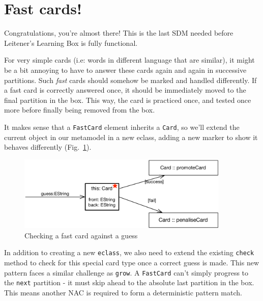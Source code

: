 \newpage
\section{Fast cards!}
\genHeader
\hypertarget{sec:fastCard}{}

Congratulations, you're almost there! This is the last SDM needed before Leitener's Learning Box is fully functional.

For very simple cards (i.e: words in different language that are similar), it might be a bit annoying to have to answer these cards again and again in
successive partitions. Such \emph{fast} cards should somehow be marked and handled differently. If a fast card is correctly answered once, it should be
immediately moved to the final partition in the box. This way, the card is practiced once, and tested once more before finally being removed from the
box.

It makes sense that a \texttt{FastCard} element inherits a \texttt{Card}, so we'll extend the current object in our metamodel in a new eclass, adding a
new marker to show it behaves differently (Fig.~\ref{fig:goal_fastCard}).

\begin{figure}[htbp]
	\centering
    \includegraphics[width=0.9\textwidth]{goal_fastCard}
	\caption{Checking a fast card against a guess}
	\label{fig:goal_fastCard}
\end{figure}
\FloatBarrier

In addition to creating a new \texttt{eclass}, we also need to extend the existing \texttt{check} method to check for this special card type once a correct
guess is made. This new pattern faces a similar challenge as \texttt{grow}. A \texttt{FastCard} can't simply progress to the \texttt{next} partition - it
must skip ahead to the absolute last partition in the box. This means another NAC is required to form a deterministic pattern match.

  



